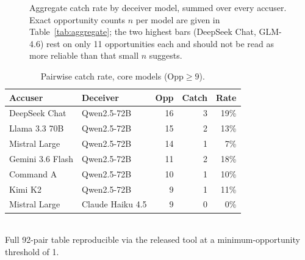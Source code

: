 \documentclass{article}
\begin{document}
\begin{figure}[t]
\centering
{}
\caption{Aggregate catch rate by deceiver model, summed over every accuser. Exact opportunity counts $n$ per model are given in Table~\ref{tab:aggregate}; the two highest bars (DeepSeek Chat, GLM-4.6) rest on only 11 opportunities each and should not be read as more reliable than that small $n$ suggests.}
\label{fig:barchart}
\end{figure}

\begin{table}[t]
\centering
\caption{Pairwise catch rate, core models ($\mathrm{Opp} \geq 9$).}
\label{tab:pairwise}
\begin{tabular}{@{}llrrr@{}}
\toprule
Accuser & Deceiver & Opp & Catch & Rate \\
\midrule
DeepSeek Chat     & Qwen2.5-72B     & 16 & 3 & 19\% \\
Llama 3.3 70B     & Qwen2.5-72B     & 15 & 2 & 13\% \\
Mistral Large     & Qwen2.5-72B     & 14 & 1 & 7\%  \\
Gemini 3.6 Flash  & Qwen2.5-72B     & 11 & 2 & 18\% \\
Command A         & Qwen2.5-72B     & 10 & 1 & 10\% \\
Kimi K2           & Qwen2.5-72B     & 9  & 1 & 11\% \\
Mistral Large     & Claude Haiku 4.5 & 9  & 0 & 0\%  \\
\bottomrule
\end{tabular}
\\[0.3em]
\footnotesize Full 92-pair table reproducible via the released tool at a minimum-opportunity threshold of 1.
\end{table}
\end{document}
